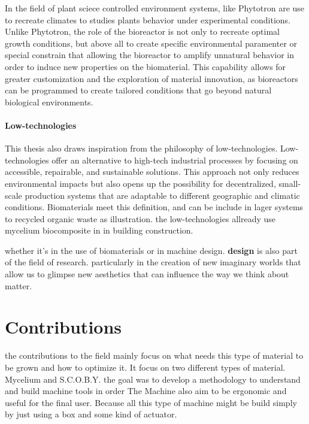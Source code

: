 In the field of plant sciece controlled environment systems, like Phytotron are use to recreate climates to studies plants behavior under experimental conditions.
Unlike Phytotron, the role of the bioreactor is not only to recreate optimal growth conditions, but above all to create specific environmental paramenter or special constrain that allowing the bioreactor to amplify unnatural behavior in order to induce new properties on the biomaterial.  This capability allows for greater customization and the exploration of material innovation, as bioreactors can be programmed to create tailored conditions that go beyond natural biological environments.
 

\paragraph[short]{Low-technologies} 
This thesis also draws inspiration from the philosophy of low-technologies.
Low-technologies offer an alternative to high-tech industrial processes by focusing on accessible, repairable, and sustainable solutions. 
This approach not only reduces environmental impacts but also opens up the possibility for decentralized, small-scale production systems that are adaptable to different geographic and climatic conditions. 
Biomaterials meet this definition, and can be include in lager systems to recycled organic waste as illustration. the low-technologies allready use mycelium biocomposite in in building construction. 

whether it's in the use of biomaterials or in machine design. \textbf{design} is also part of the field of research. particularly in the creation of new imaginary worlds that allow us to glimpse new aesthetics that can influence the way we think about matter. 



\section{Contributions}

the contributions to the field mainly focus on what needs this type of material to be grown and how to optimize it.
It focus on two different types of material. Mycelium and S.C.O.B.Y. 
the goal was to develop a methodology to understand and build machine tools in order 
The Machine also aim to be ergonomic and useful for the final user. Because all this type of machine might be build simply by just using a box and some kind of actuator.
